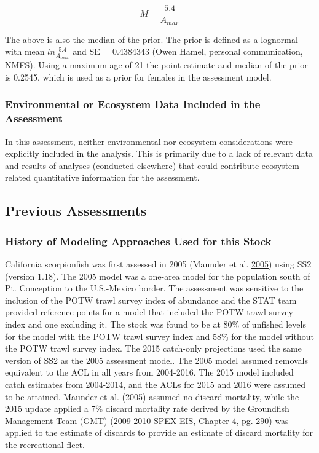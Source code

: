\documentclass[12pt,]{article}
\begin{document}
\begin{equation}
M = \frac{5.4}{A_{max}}
\end{equation}

The above is also the median of the prior. The prior is defined as a
lognormal with mean \(ln\frac{5.4}{A_{max}}\) and SE = 0.4384343 (Owen
Hamel, personal communication, NMFS). Using a maximum age of 21 the
point estimate and median of the prior is 0.2545, which is used as a
prior for females in the assessment model.

\vspace{.5cm}

\subsubsection{Environmental or Ecosystem Data Included in the
Assessment}\label{environmental-or-ecosystem-data-included-in-the-assessment}

In this assessment, neither environmental nor ecosystem considerations
were explicitly included in the analysis. This is primarily due to a
lack of relevant data and results of analyses (conducted elsewhere) that
could contribute ecosystem-related quantitative information for the
assessment.

\subsection{Previous Assessments}\label{previous-assessments}

\subsubsection{History of Modeling Approaches Used for this
Stock}\label{history-of-modeling-approaches-used-for-this-stock}

California scorpionfish was first assessed in 2005 (Maunder et al.
\protect\hyperlink{ref-Maunder2005}{2005}) using SS2 (version 1.18). The
2005 model was a one-area model for the population south of Pt.
Conception to the U.S.-Mexico border. The assessment was sensitive to
the inclusion of the POTW trawl survey index of abundance and the STAT
team provided reference points for a model that included the POTW trawl
survey index and one excluding it. The stock was found to be at 80\% of
unfished levels for the model with the POTW trawl survey index and 58\%
for the model without the POTW trawl survey index. The 2015 catch-only
projections used the same version of SS2 as the 2005 assessment model.
The 2005 model assumed removals equivalent to the ACL in all years from
2004-2016. The 2015 model included catch estimates from 2004-2014, and
the ACLs for 2015 and 2016 were assumed to be attained. Maunder et al.
(\protect\hyperlink{ref-Maunder2005}{2005}) assumed no discard
mortality, while the 2015 update applied a 7\% discard mortality rate
derived by the Groundfish Management Team (GMT)
(\href{http://www.pcouncil.org/wp-content/uploads/chp4_0910.pdf}{2009-2010
SPEX EIS, Chapter 4, pg. 290}) was applied to the estimate of discards
to provide an estimate of discard mortality for the recreational fleet.
\end{document}
